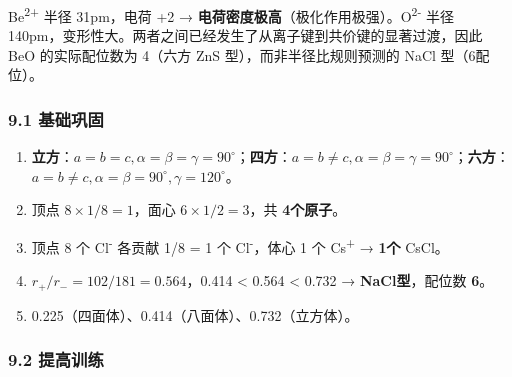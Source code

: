 \documentclass[a4paper,11pt]{ctexart}
\begin{document}
Be\textsuperscript{2+} 半径 31pm，电荷 +2 → \textbf{电荷密度极高}（极化作用极强）。O\textsuperscript{2-} 半径 140pm，变形性大。两者之间已经发生了从离子键到共价键的显著过渡，因此 BeO 的实际配位数为 4（六方 ZnS 型），而非半径比规则预测的 NaCl 型（6配位）。

\subsubsection{9.1 基础巩固}\label{ux57faux7840ux5de9ux56fa-1}

\begin{enumerate}
\def\labelenumi{\arabic{enumi}.}
\item
  \textbf{立方}：\(a=b=c, \alpha=\beta=\gamma=90^\circ\)；\textbf{四方}：\(a=b\neq c, \alpha=\beta=\gamma=90^\circ\)；\textbf{六方}：\(a=b\neq c, \alpha=\beta=90^\circ, \gamma=120^\circ\)。
\item
  顶点 \(8 \times 1/8 = 1\)，面心 \(6 \times 1/2 = 3\)，共 \textbf{4个原子}。
\item
  顶点 8 个 Cl\textsuperscript{-} 各贡献 1/8 = 1 个 Cl\textsuperscript{-}，体心 1 个 Cs\textsuperscript{+} → \textbf{1个} CsCl。
\item
  \(r_+/r_- = 102/181 = 0.564\)，0.414 \textless{} 0.564 \textless{} 0.732 → \textbf{NaCl型}，配位数 \textbf{6}。
\item
  0.225（四面体）、0.414（八面体）、0.732（立方体）。
\end{enumerate}

\subsubsection{9.2 提高训练}\label{ux63d0ux9ad8ux8badux7ec3-1}
\end{document}
